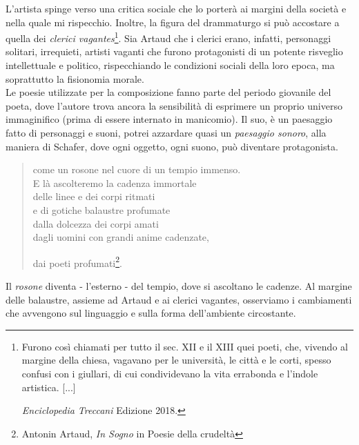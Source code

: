 L'artista spinge verso una critica sociale che lo porterà ai margini della società e nella quale mi rispecchio. Inoltre, la figura del drammaturgo si può accostare a quella dei \textit{clerici vagantes}\footnote{Furono così chiamati per tutto il sec. XII e il XIII quei poeti, che, vivendo al margine della chiesa, vagavano per le università, le città e le corti, spesso confusi con i giullari, di cui condividevano la vita errabonda e l'indole artistica. [...]

\textit{Enciclopedia Treccani} Edizione 2018.}. Sia Artaud che i clerici erano, infatti, personaggi solitari, irrequieti, artisti vaganti che furono protagonisti di un potente risveglio intellettuale e politico, rispecchiando le condizioni sociali della loro epoca, ma soprattutto la fisionomia morale. \\
Le poesie utilizzate per la composizione fanno parte del periodo giovanile del poeta, dove l'autore trova ancora la sensibilità di esprimere un proprio universo immaginifico (prima di essere internato in manicomio). Il suo, è un paesaggio fatto di personaggi e suoni, potrei azzardare quasi un \textit{paesaggio sonoro}, alla maniera di Schafer, dove ogni oggetto, ogni suono, può diventare protagonista.

\begin{quotation}
{\sf [...] come un rosone nel cuore di un tempio immenso. \\
E là ascolteremo la cadenza immortale \\
delle linee e dei corpi ritmati \\
e di gotiche balaustre profumate \\
dalla dolcezza dei corpi amati \\
dagli uomini con grandi anime cadenzate, \\
\centerline{dai poeti profumati\footnote{Antonin Artaud, \textit{In Sogno} in Poesie della crudeltà}.}}
\end{quotation}

Il \textit{rosone} diventa - l'esterno -  del tempio, dove si ascoltano le cadenze. Al margine delle balaustre, assieme ad Artaud e ai clerici vagantes, osserviamo i cambiamenti che avvengono sul linguaggio e sulla forma dell'ambiente circostante. 


